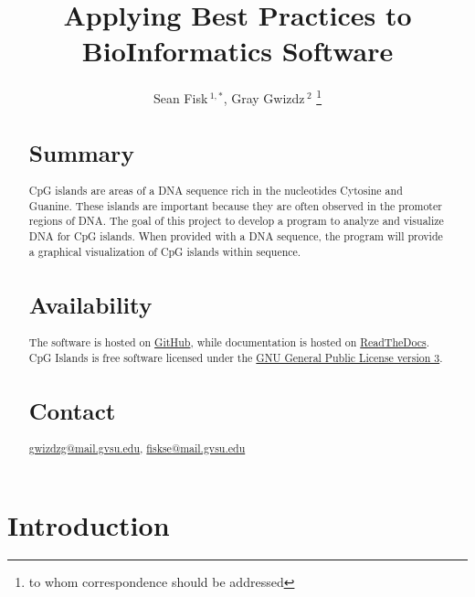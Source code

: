 \documentclass{bioinfo}
\begin{document}

\title[Applying Best Practices]{Applying Best Practices to BioInformatics Software}
\author[Sample \textit{et~al}]{Sean Fisk\,$^{1,*}$, Gray Gwizdz\,$^{2}$ \footnote{to whom correspondence should be addressed}}
\address{$^{1}$Grand Valley State University\\
  $^{2}$Grand Valley State University}



\maketitle

\begin{abstract}

  \section{Summary}
  CpG islands are areas of a DNA sequence rich in the nucleotides
  Cytosine and Guanine. These islands are important because they are
  often observed in the promoter regions of DNA. The goal of this
  project to develop a program to analyze and visualize DNA for CpG
  islands. When provided with a DNA sequence, the program will provide a
  graphical visualization of CpG islands within sequence.

  \section{Availability}
  The software is hosted on
  \href{https://github.com/seanfisk/cpg-islands/}{GitHub}, while
  documentation is hosted on
  \href{https://cpg-islands.readthedocs.org/en/latest/}{ReadTheDocs}. CpG
  Islands is free software licensed under the
  \href{http://www.gnu.org/licenses/gpl.html#content}{GNU General Public
    License version 3}.

  \section{Contact} \href{gwizdzg@mail.gvsu.edu}{gwizdzg@mail.gvsu.edu}, \href{fiskse@mail.gvsu.edu}{fiskse@mail.gvsu.edu}
\end{abstract}

\section{Introduction}
\end{document}
